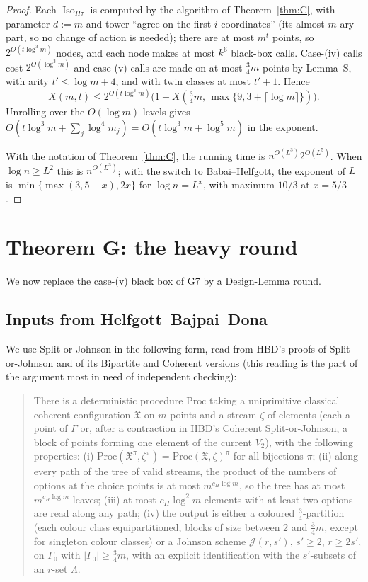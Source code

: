 \documentclass[11pt]{article}
\theoremstyle{definition}
\theoremstyle{remark}
\newcommand{\Iso}{\operatorname{Iso}}
\newcommand{\fX}{\mathfrak X}
\begin{document}
\begin{proof}
Each $\Iso_{H\tau}$ is computed by the algorithm of Theorem~\ref{thm:C}, with parameter $d:=m$ and tower ``agree on the first $i$ coordinates'' (its almost $m$-ary part, so no change of action is needed); there are at most $m^t$ points, so $2^{O(t\log^3 m)}$ nodes, and each node makes at most $k^6$ black-box calls. Case-(iv) calls cost $2^{O(\log^3 m)}$ and case-(v) calls are made on at most $\tfrac34 m$ points by Lemma~S, with arity $t'\le\log m+4$, and with twin classes at most $t'+1$. Hence
\[
X(m,t)\le 2^{O(t\log^3 m)}\bigl(1+X(\tfrac34m,\,\max\{9,3+\lceil\log m\rceil\})\bigr).
\]
Unrolling over the $O(\log m)$ levels gives $O(t\log^3m+\sum_j\log^4m_j)=O(t\log^3m+\log^5m)$ in the exponent.

With the notation of Theorem~\ref{thm:C}, the running time is $n^{O(L^3)}2^{O(L^5)}$. When $\log n\ge L^2$ this is $n^{O(L^3)}$; with the switch to Babai--Helfgott, the exponent of $L$ is $\min\{\max(3,5-x),2x\}$ for $\log n=L^x$, with maximum $10/3$ at $x=5/3$.
\end{proof}

\section{Theorem G: the heavy round}\label{sec:heavy}

We now replace the case-(v) black box of G7 by a Design-Lemma round.

\subsection{Inputs from Helfgott--Bajpai--Dona}

We use Split-or-Johnson in the following form, read from HBD's proofs of Split-or-Johnson and of its Bipartite and Coherent versions (this reading is the part of the argument most in need of independent checking):

\begin{quote}
There is a deterministic procedure $\mathrm{Proc}$ taking a uniprimitive classical coherent configuration $\fX$ on $m$ points and a stream $\zeta$ of elements (each a point of $\Gamma$ or, after a contraction in HBD's Coherent Split-or-Johnson, a block of points forming one element of the current $V_2$), with the following properties: \textup{(i)} $\mathrm{Proc}(\fX^\pi,\zeta^\pi)=\mathrm{Proc}(\fX,\zeta)^\pi$ for all bijections $\pi$; \textup{(ii)} along every path of the tree of valid streams, the product of the numbers of options at the choice points is at most $m^{c_H\log m}$, so the tree has at most $m^{c_H\log m}$ leaves; \textup{(iii)} at most $c_H\log^2m$ elements with at least two options are read along any path; \textup{(iv)} the output is either a coloured $\tfrac34$-partition (each colour class equipartitioned, blocks of size between $2$ and $\tfrac34 m$, except for singleton colour classes) or a Johnson scheme $\mathcal J(r,s')$, $s'\ge2$, $r\ge2s'$, on $\Gamma_0$ with $|\Gamma_0|\ge\tfrac34m$, with an explicit identification with the $s'$-subsets of an $r$-set $\Lambda$.
\end{quote}
\end{document}
